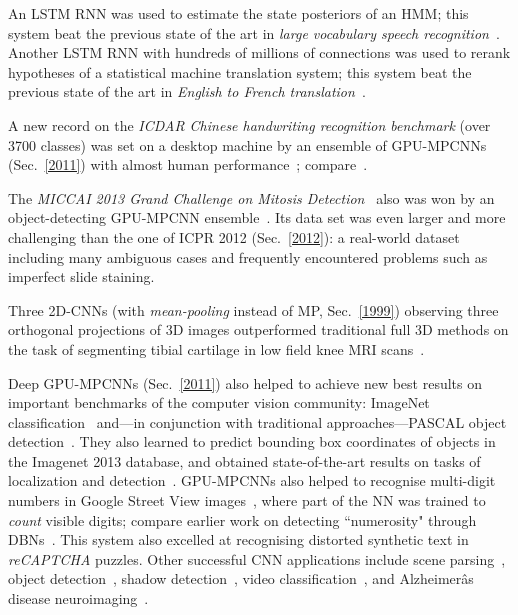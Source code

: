 \documentclass[letterpaper]{article}
\begin{document}
\begin{CJK*}{UTF8}{gbsn}
\begin{sloppypar}
An LSTM RNN was used to estimate the state posteriors of an HMM; this system
 beat the previous state of the art in {\em large vocabulary speech recognition}~\citep{sak2014,sak2014large}. 
Another LSTM RNN with hundreds of millions of connections was used to rerank hypotheses of a statistical machine translation system; this system
beat the previous state of the art in {\em English to French translation}~\citep{sutskever2014}.

A new record on the {\em ICDAR Chinese handwriting recognition 
benchmark} (over 3700 classes) was set on a desktop machine
by an ensemble of GPU-MPCNNs (Sec.~\ref{2011}) with almost human performance~\citep{chinese2013};
compare~\citep{icdar2013}.

The {\em MICCAI 2013 Grand Challenge on Mitosis Detection}~\citep{miccai13}
also was won by an object-detecting  GPU-MPCNN ensemble~\citep{miccai2013}.
Its data set was even larger and more challenging than the one of ICPR 2012 (Sec.~\ref{2012}): a real-world dataset including many ambiguous cases and frequently encountered problems such as imperfect slide staining. 

Three 2D-CNNs (with {\em mean-pooling} instead of MP, Sec.~\ref{1999}) observing three orthogonal projections of 3D images
outperformed traditional full 3D methods on the task of segmenting tibial
cartilage in low field knee MRI scans~\citep{prasoon:13}.
 


Deep GPU-MPCNNs (Sec.~\ref{2011}) also helped to achieve new best results
on important benchmarks of the computer vision community:
ImageNet classification~\citep{zeiler2013,szegedy2014} 
and---in 
conjunction with traditional 
approaches---PASCAL object detection~\citep{malik2013}.
They also learned to predict bounding box coordinates  of
 objects in the Imagenet 2013 database,
and obtained state-of-the-art results on tasks of localization and 
detection~\citep{sermanet2013}.
GPU-MPCNNs also helped to recognise
multi-digit numbers  in Google Street View images~\citep{goodfellow2014multi},
where part of the NN was trained to {\em count} visible digits;
compare earlier work on detecting ``numerosity" through DBNs~\citep{stoianov2012}.
This system also excelled at recognising distorted synthetic text in {\em reCAPTCHA} puzzles.
Other successful CNN applications include 
scene parsing~\citep{Farabet2013}, object detection~\citep{Szegedy2013},
shadow detection~\citep{khan2014},
video classification~\citep{karpathy2014},
and Alzheimerâs disease neuroimaging~\citep{shuiwang2014}.





\end{sloppypar}
\end{CJK*}
\end{document}
